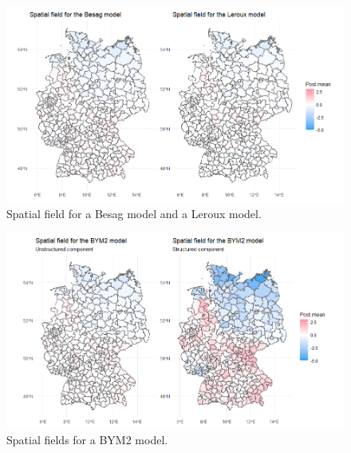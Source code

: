 \begin{figure}[H]
    \centering
    \includegraphics[width = \textwidth]{spatial_field_germany_1.png}
    \caption{Spatial field for a Besag model and a Leroux model.}
    \label{comparison_germany_6}
\end{figure}
\begin{figure}[H]
    \centering
    \includegraphics[width = \textwidth]{spatial_field_germany_2.png}
    \caption{Spatial fields for a BYM2 model.}
    \label{comparison_germany_7}
\end{figure}
\clearpage
